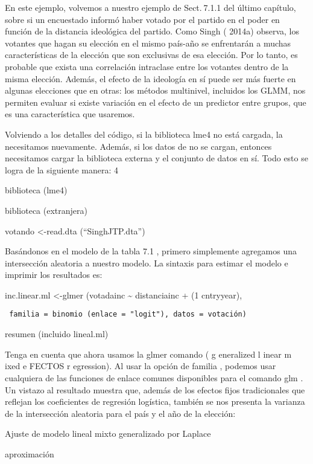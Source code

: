 \documentclass[
]{book}
\begin{document}
En este ejemplo, volvemos a nuestro ejemplo de Sect. 7.1.1 del último capítulo, sobre si un encuestado informó haber votado por el partido en el poder en función de la distancia ideológica del partido. Como Singh ( 2014a) observa, los votantes que hagan su elección en el mismo país-año se enfrentarán a muchas características de la elección que son exclusivas de esa elección. Por lo tanto, es probable que exista una correlación intraclase entre los votantes dentro de la misma elección. Además, el efecto de la ideología en sí puede ser más fuerte en algunas elecciones que en otras: los métodos multinivel, incluidos los GLMM, nos permiten evaluar si existe variación en el efecto de un predictor entre grupos, que es una característica que usaremos.

Volviendo a los detalles del código, si la biblioteca lme4 no está cargada, la necesitamos nuevamente. Además, si los datos de no se cargan, entonces necesitamos cargar la biblioteca externa y el conjunto de datos en sí. Todo esto se logra de la siguiente manera: 4

biblioteca (lme4)

biblioteca (extranjera)

votando \textless-read.dta (``SinghJTP.dta'')

Basándonos en el modelo de la tabla 7.1 , primero simplemente agregamos una intersección aleatoria a nuestro modelo. La sintaxis para estimar el modelo e imprimir los resultados es:

inc.linear.ml \textless-glmer (votadainc \textasciitilde{} distanciainc + (1 \textbar{} cntryyear),

\begin{verbatim}
 familia = binomio (enlace = "logit"), datos = votación)
\end{verbatim}

resumen (incluido lineal.ml)

Tenga en cuenta que ahora usamos la glmer comando ( g eneralized l inear m ixed e FECTOS r egression). Al usar la opción de familia , podemos usar cualquiera de las funciones de enlace comunes disponibles para el comando glm . Un vistazo al resultado muestra que, además de los efectos fijos tradicionales que reflejan los coeficientes de regresión logística, también se nos presenta la varianza de la intersección aleatoria para el país y el año de la elección:

Ajuste de modelo lineal mixto generalizado por Laplace

aproximación
\end{document}
